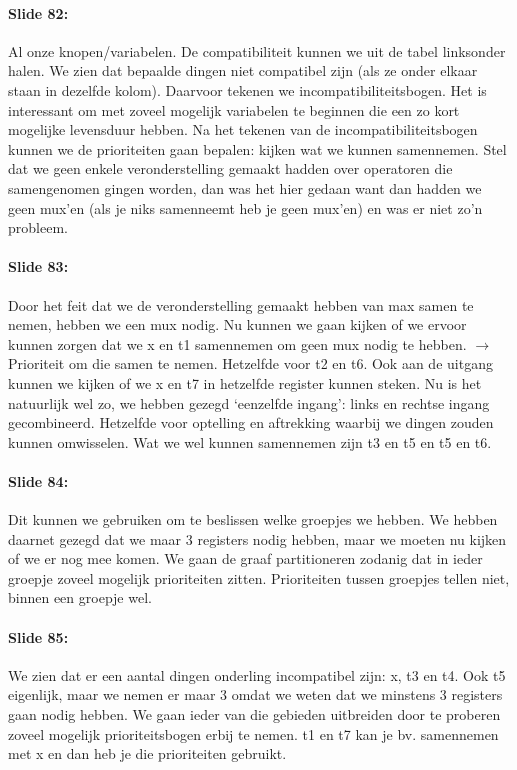 \documentclass[10pt,a4paper]{book}
\begin{document}
\paragraph{Slide 82:} Al onze knopen/variabelen. De compatibiliteit kunnen we uit de tabel linksonder halen. We zien dat bepaalde dingen niet compatibel zijn (als ze onder elkaar staan in dezelfde kolom). Daarvoor tekenen we incompatibiliteitsbogen. Het is interessant om met zoveel mogelijk variabelen te beginnen die een zo kort mogelijke levensduur hebben. Na het tekenen van de incompatibiliteitsbogen kunnen we de prioriteiten gaan bepalen: kijken wat we kunnen samennemen. Stel dat we geen enkele veronderstelling gemaakt hadden over operatoren die samengenomen gingen worden, dan was het hier gedaan want dan hadden we geen mux'en (als je niks samenneemt heb je geen mux'en) en was er niet zo'n probleem. 

\paragraph{Slide 83:} Door het feit dat we de veronderstelling gemaakt hebben van max samen te nemen, hebben we een mux nodig. Nu kunnen we gaan kijken of we ervoor kunnen zorgen dat we x en t1 samennemen om geen mux nodig te hebben. $\rightarrow$ Prioriteit om die samen te nemen. Hetzelfde voor t2 en t6. Ook aan de uitgang kunnen we kijken of we x en t7 in hetzelfde register kunnen steken.
Nu is het natuurlijk wel zo, we hebben gezegd `eenzelfde ingang': links en rechtse ingang gecombineerd. Hetzelfde voor optelling en aftrekking waarbij we dingen zouden kunnen omwisselen. Wat we wel kunnen samennemen zijn t3 en t5 en t5 en t6.

\paragraph{Slide 84:} Dit kunnen we gebruiken om te beslissen welke groepjes we hebben. We hebben daarnet gezegd dat we maar 3 registers nodig hebben, maar we moeten nu kijken of we er nog mee komen. We gaan de graaf partitioneren zodanig dat in ieder groepje zoveel mogelijk prioriteiten zitten. Prioriteiten tussen groepjes tellen niet, binnen een groepje wel.

\paragraph{Slide 85:} We zien dat er een aantal dingen onderling incompatibel zijn: x, t3 en t4. Ook t5 eigenlijk, maar we nemen er maar 3 omdat we weten dat we minstens 3 registers gaan nodig hebben.
We gaan ieder van die gebieden uitbreiden door te proberen zoveel mogelijk prioriteitsbogen erbij te nemen. t1 en t7 kan je bv. samennemen met x en dan heb je die prioriteiten gebruikt. 
\end{document}
